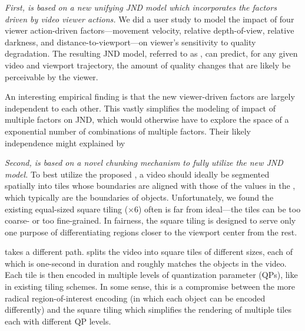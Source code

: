 \vspace{0.2cm}
{\em First, \name is based on a new unifying JND model which incorporates the factors driven by \vr video viewer actions.}
We did a user study to model the impact of four viewer action-driven factors---movement velocity, relative depth-of-view, relative darkness, and distance-to-viewport---on viewer's sensitivity to quality degradation.
The resulting JND model, referred to as {\em \vrjnd}, can predict, for any given video and viewport trajectory, the amount of quality changes  that are likely be perceivable by the viewer.

An interesting empirical finding is that the new viewer-driven factors are largely independent to each other.
This vastly simplifies the modeling of impact of multiple factors on JND, which would otherwise have to explore the space of a exponential number of combinations of multiple factors.
Their likely independence might explained by 


\vspace{0.2cm}
{\em Second, \name is based on a novel chunking mechanism to fully utilize the new JND model.}
To best utilize the proposed \vrjnd,  a video should ideally be segmented spatially into tiles whose boundaries are aligned with those of the values in the \vrjnd, which typically are the boundaries of objects.
Unfortunately, we found the existing equal-sized square tiling ($\times$6) often is far from ideal---the tiles can be too coarse- or too fine-grained. 
In fairness, the square tiling is designed to serve only one purpose of differentiating regions closer to the viewport center from the rest.

\name takes a different path. 
\name splits the \vr video into square tiles of different sizes, each of which is one-second in duration and roughly matches the objects in the video. Each tile is then encoded in multiple levels of quantization parameter (QPs), like in existing tiling schemes.
In some sense, this is a compromise between the more radical region-of-interest encoding (in which each object can be encoded differently) and the square tiling which simplifies the rendering of multiple tiles each with different QP levels.




